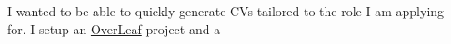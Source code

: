 \descript{ }
\vspace*{-\topsep}  %
\begin{justify}
I wanted to be able to quickly generate CVs tailored to the role I am applying for.
I setup an \href{https://www.overleaf.com}{OverLeaf} project and a \href{https://www.github.com}{}
\end{justify}